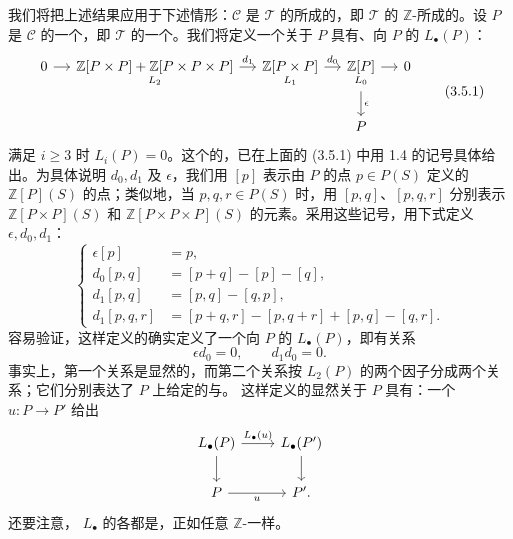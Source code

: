 我们将把上述结果应用于下述情形：$\mathcal C$ 是 $\mathcal T$ 的所成的，即 $\mathcal T$ 的 $\mathbb Z$-所成的。设 $P$ 是 $\mathcal C$ 的一个，即 $\mathcal T$ 的一个。我们将定义一个关于 $P$ 具有、向 $P$ 的 $L_\bullet(P)$：
\[
\begin{tikzcd}[column sep=small]
0\arrow[r]&\underset{L_2}{\mathbb Z[P\times P]+\mathbb Z[P\times P\times P]}\arrow[r,"d_1"]&\underset{L_1}{\mathbb Z[P\times P]}\arrow[r,"d_0"]&\underset{L_0}{\mathbb Z[P]}\arrow[r]\arrow[d,"\epsilon"]&0\\
&&&P&
\end{tikzcd}\tag{3.5.1}
\]
满足 $i\geq3$ 时 $L_i(P)=0$。这个的，已在上面的 (3.5.1) 中用 1.4 的记号具体给出。为具体说明 $d_0,d_1$ 及 $\epsilon$，我们用 $[p]$ 表示由 $P$ 的点 $p\in P(S)$ 定义的 $\mathbb Z[P](S)$ 的点；类似地，当 $p,q,r\in P(S)$ 时，用 $[p,q]$、$[p,q,r]$ 分别表示 $\mathbb Z[P\times P](S)$ 和 $\mathbb Z[P\times P\times P](S)$ 的元素。采用这些记号，用下式定义 $\epsilon,d_0,d_1$：
\[
\left\{\begin{aligned}
\epsilon[p]&=p,\\
d_0[p,q]&=[p+q]-[p]-[q],\\
d_1[p,q]&=[p,q]-[q,p],\\
d_1[p,q,r]&=[p+q,r]-[p,q+r]+[p,q]-[q,r].
\end{aligned}\right.\tag{3.5.2}
\]
容易验证，这样定义的确实定义了一个向 $P$ 的 $L_\bullet(P)$，即有关系
\[
\epsilon d_0=0,\qquad d_1d_0=0.
\]
事实上，第一个关系是显然的，而第二个关系按 $L_2(P)$ 的两个因子分成两个关系；它们分别表达了 $P$ 上给定的与。
这样定义的显然关于 $P$ 具有：一个 $u:P\to P'$ 给出
\[
\begin{tikzcd}
L_\bullet(P)\arrow[r,"L_\bullet(u)"]\arrow[d]&L_\bullet(P')\arrow[d]\\
P\arrow[r,"u"']&P'.
\end{tikzcd}
\]
还要注意， $L_\bullet$ 的各都是，正如任意 $\mathbb Z$-一样。

